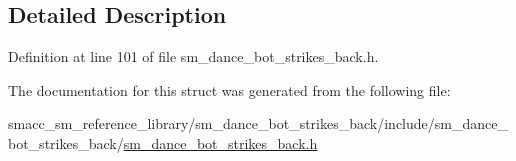 \subsection{Detailed Description}


Definition at line 101 of file sm\+\_\+dance\+\_\+bot\+\_\+strikes\+\_\+back.\+h.



The documentation for this struct was generated from the following file\+:\begin{DoxyCompactItemize}
\item 
smacc\+\_\+sm\+\_\+reference\+\_\+library/sm\+\_\+dance\+\_\+bot\+\_\+strikes\+\_\+back/include/sm\+\_\+dance\+\_\+bot\+\_\+strikes\+\_\+back/\hyperlink{sm__dance__bot__strikes__back_8h}{sm\+\_\+dance\+\_\+bot\+\_\+strikes\+\_\+back.\+h}\end{DoxyCompactItemize}
